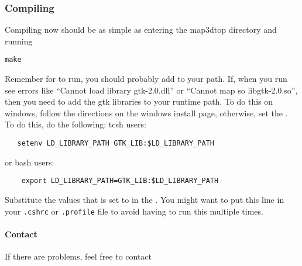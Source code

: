 \subsubsection{Compiling \map{}}
Compiling \map{} now should be as simple as entering the map3dtop directory
and running
%
\begin{verbatim}
make
\end{verbatim}

Remember for \map{} to run, you should probably add \map{} to your path.
If, when you run \map{} see errors like ``Cannot load library gtk-2.0.dll''
or ``Cannot map so libgtk-2.0.so'', then you need to add the gtk libraries
to your runtime path.  To do this on windows, follow the directions on the
windows install page, otherwise, set the .
To do this, do the following:
%
tcsh users:
\begin{verbatim}
   setenv LD_LIBRARY_PATH GTK_LIB:$LD_LIBRARY_PATH
\end{verbatim}
%
or bash users:
%
\begin{verbatim} 
    export LD_LIBRARY_PATH=GTK_LIB:$LD_LIBRARY_PATH
\end{verbatim}
%

Substitute the values that  is set to in the
.  You might want to put this line in your \texttt{.cshrc}
or \texttt{.profile} file to avoid having to run this multiple times.


\paragraph{Contact}
If there are problems, feel free to contact


